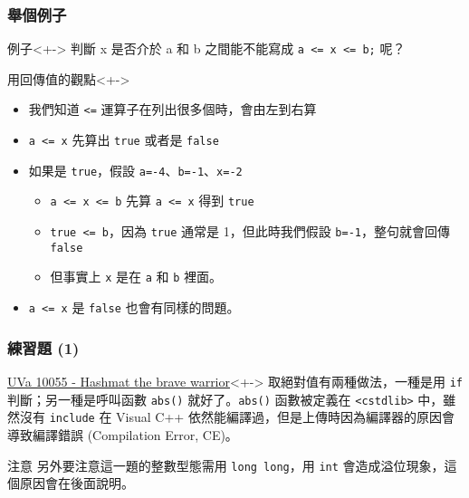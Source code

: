 \documentclass[utf8]{beamer}
\begin{document}
\begin{CJK}{UTF8}{bkai}
\begin{frame}[fragile]
  \frametitle{舉個例子}
  \begin{block}{例子}<+->
  判斷 x 是否介於 a 和 b 之間能不能寫成 \lstinline{a <= x <= b;}{} 呢？
  \end{block}
  \begin{exampleblock}{用回傳值的觀點}<+->
    \begin{itemize}
    \item 我們知道 \lstinline{<=}{} 運算子在列出很多個時，會\alert{由左到右算}
    \item<+-> \alert{\lstinline{a <= x}{}} 先算出 \lstinline{true}{} 或者是 \lstinline{false}{}
    \item<+-> 如果是 \lstinline{true}{}，假設 \lstinline{a=-4}{}、\lstinline{b=-1}{}、\lstinline{x=-2}{}
      \begin{itemize}[<+->]
      \item \lstinline{a <= x <= b}{} 先算 \lstinline{a <= x}{} 得到 \lstinline{true}{}
      \item \lstinline{true <= b}{}，因為 \lstinline{true}{} 通常是 1，但此時我們假設 \lstinline{b=-1}{}，整句就會回傳 \lstinline{false}{}
      \item 但事實上 \lstinline{x}{} 是在 \lstinline{a}{} 和 \lstinline{b}{} 裡面。
      \end{itemize}
    \item<+-> \lstinline{a <= x}{} 是 \lstinline{false}{} 也會有同樣的問題。
    \end{itemize}
  \end{exampleblock}
\end{frame}

\begin{frame}[fragile]
  \frametitle{練習題 (1)}
  \begin{exampleblock}{\href{http://unfortunate-dog.github.io/articles/100/p10055/}{UVa 10055 - Hashmat the brave warrior}}<+->
  \label{uva:10055}
  取絕對值有兩種做法，一種是用 \lstinline{if}{} 判斷；另一種是呼叫函數 \lstinline{abs()}{} 就好了。\lstinline{abs()}{} 函數被定義在 \lstinline{<cstdlib>}{} 中，雖然沒有 \lstinline{include}{} 在 Visual C++ 依然能編譯過，但是上傳時因為編譯器的原因會導致\alert{編譯錯誤} (Compilation Error, CE)。
  \end{exampleblock}
  \begin{alertblock}{注意}
  另外要注意這一題的整數型態需用 \lstinline{long long}{}，用 \lstinline{int}{} 會造成溢位現象，這個原因會在後面說明。
  \end{alertblock}
\end{frame}


\end{CJK}
\end{document}
